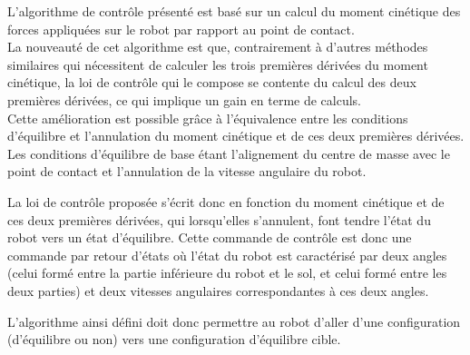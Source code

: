\documentclass[a4paper,12pt]{report}
\begin{document}
L'algorithme de contrôle présenté est basé sur un calcul du moment cinétique des forces appliquées sur le robot par rapport au point de contact.\\
La nouveauté de cet algorithme est que, contrairement à d'autres méthodes similaires qui nécessitent de calculer les trois premières dérivées du moment cinétique, la loi de contrôle qui le compose se contente du calcul des deux premières dérivées, ce qui implique un gain en terme de calculs.\\
Cette amélioration est possible grâce à l'équivalence entre les conditions d'équilibre et l'annulation du moment cinétique et de ces deux premières dérivées. Les conditions d'équilibre de base étant l'alignement du centre de masse avec le point de contact et l'annulation de la vitesse angulaire du robot.

La loi de contrôle proposée s'écrit donc en fonction du moment cinétique et de ces deux premières dérivées, qui lorsqu'elles s'annulent, font tendre l'état du robot vers un état d'équilibre. Cette commande de contrôle est donc une commande par retour d'états où
l'état du robot est caractérisé par deux angles (celui formé entre la partie inférieure du robot et le sol, et celui formé entre les deux parties) et deux vitesses angulaires correspondantes à ces deux angles.

L'algorithme ainsi défini doit donc permettre au robot d'aller d'une configuration (d'équilibre ou non) vers une configuration d'équilibre cible.
\end{document}
